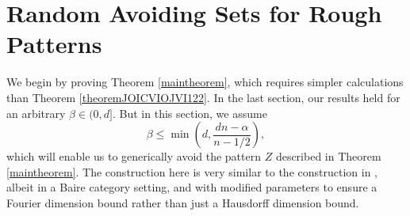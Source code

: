 \documentclass[dvipsnames,letterpaper,12pt]{article}
\numberwithin{equation}{section}
\numberwithin{theorem}{section}
\begin{document}
\section{Random Avoiding Sets for Rough Patterns}

We begin by proving Theorem \ref{maintheorem}, which requires simpler calculations than Theorem \ref{theoremJOICVIOJVI122}. In the last section, our results held for an arbitrary $\beta \in (0,d]$. But in this section, we assume
%
\[ \beta \leq \min \left( d, \frac{dn - \alpha}{n - 1/2} \right), \]
%
which will enable us to generically avoid the pattern $Z$ described in Theorem \ref{maintheorem}. The construction here is very similar to the construction in \cite{OurPaper}, albeit in a Baire category setting, and with modified parameters to ensure a Fourier dimension bound rather than just a Hausdorff dimension bound.
\end{document}
